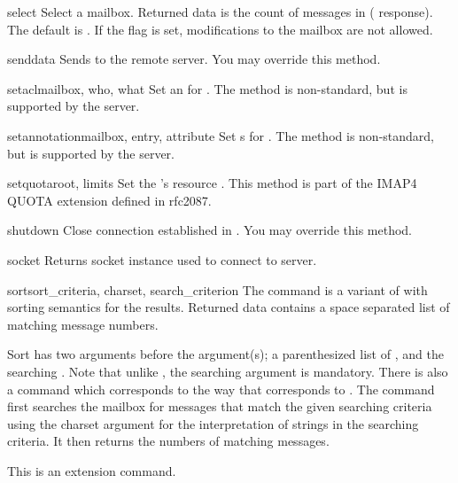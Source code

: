 \begin{methoddesc}[IMAP4]{select}{}
  Select a mailbox. Returned data is the count of messages in
   ( response).  The default 
  is .  If the  flag is set, modifications
  to the mailbox are not allowed.
\end{methoddesc}

\begin{methoddesc}[IMAP4]{send}{data}
  Sends  to the remote server.
  You may override this method.
\end{methoddesc}

\begin{methoddesc}[IMAP4]{setacl}{mailbox, who, what}
  Set an  for .
  The method is non-standard, but is supported by the  server.
\end{methoddesc}

\begin{methoddesc}[IMAP4]{setannotation}{mailbox, entry, attribute}
  Set s for .
  The method is non-standard, but is supported by the  server.
\end{methoddesc}

\begin{methoddesc}[IMAP4]{setquota}{root, limits}
  Set the  's resource .
  This method is part of the IMAP4 QUOTA extension defined in rfc2087.
\end{methoddesc}

\begin{methoddesc}[IMAP4]{shutdown}{}
  Close connection established in .
  You may override this method.
\end{methoddesc}

\begin{methoddesc}[IMAP4]{socket}{}
  Returns socket instance used to connect to server.
\end{methoddesc}

\begin{methoddesc}[IMAP4]{sort}{sort_criteria, charset, search_criterion}
  The  command is a variant of  with sorting
  semantics for the results.  Returned data contains a space separated
  list of matching message numbers.

  Sort has two arguments before the 
  argument(s); a parenthesized list of , and the
  searching .  Note that unlike , the
  searching  argument is mandatory.  There is also a
   command which corresponds to  the way
  that  corresponds to .  The
   command first searches the mailbox for messages that
  match the given searching criteria using the charset argument for
  the interpretation of strings in the searching criteria.  It then
  returns the numbers of matching messages.

  This is an  extension command.
\end{methoddesc}

